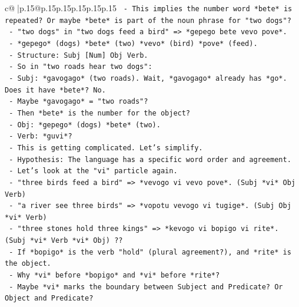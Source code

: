 \documentclass{article}
\begin{document}
{\begin{supertabular}{c@{$\;$}|p{.15\linewidth}@{}p{.15\linewidth}p{.15\linewidth}p{.15\linewidth}p{.15\linewidth}p{.15\linewidth}}
{{{\texttt{                             {-} This implies the number word *bete* is repeated? Or maybe *bete* is part of the noun phrase for "two dogs"?} \\
\texttt{                             {-} "two dogs" in "two dogs feed a bird" => *gepego bete vevo pove*.} \\
\texttt{                               {-} *gepego* (dogs) *bete* (two) *vevo* (bird) *pove* (feed).} \\
\texttt{                               {-} Structure: Subj {[}Num{]} Obj Verb.} \\
\texttt{                             {-} So in "two roads hear two dogs":} \\
\texttt{                               {-} Subj: *gavogago* (two roads). Wait, *gavogago* already has *go*. Does it have *bete*? No.} \\
\texttt{                               {-} Maybe *gavogago* = "two roads"?} \\
\texttt{                               {-} Then *bete* is the number for the object?} \\
\texttt{                               {-} Obj: *gepego* (dogs) *bete* (two).} \\
\texttt{                               {-} Verb: *guvi*?} \\
\texttt{                               {-} This is getting complicated. Let's simplify.} \\
\texttt{                               {-} Hypothesis: The language has a specific word order and agreement.} \\
\texttt{                               {-} Let's look at the "vi" particle again.} \\
\texttt{                               {-} "three birds feed a bird" => *vevogo vi vevo pove*. (Subj *vi* Obj Verb)} \\
\texttt{                               {-} "a river see three birds" => *vopotu vevogo vi tugige*. (Subj Obj *vi* Verb)} \\
\texttt{                               {-} "three stones hold three kings" => *kevogo vi bopigo vi rite*. (Subj *vi* Verb *vi* Obj) ??} \\
\texttt{                                 {-} If *bopigo* is the verb "hold" (plural agreement?), and *rite* is the object.} \\
\texttt{                                 {-} Why *vi* before *bopigo* and *vi* before *rite*?} \\
\texttt{                                 {-} Maybe *vi* marks the boundary between Subject and Predicate? Or Object and Predicate?} \\
}}}
\end{supertabular}}
\end{document}

